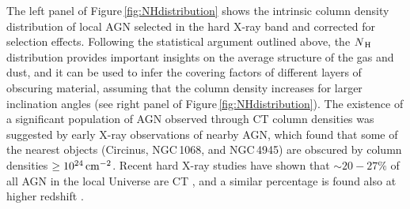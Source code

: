 \documentclass{natureprintstyle}
\begin{document}

The left panel of Figure\,\ref{fig:NHdistribution} shows the intrinsic column density distribution of local AGN selected in the hard X-ray band and corrected for selection effects. Following the statistical argument outlined above, the $N_{\rm\,H}$ distribution provides important insights on the average structure of the gas and dust, and it can be used to infer the covering factors of different layers of obscuring material, assuming that the column density increases for larger inclination angles (see right panel of Figure\,\ref{fig:NHdistribution}). 
%
%
The existence of a significant population of AGN observed through CT column densities was suggested by early X-ray observations of nearby AGN\cite{Risaliti:1999dw}, which found that some of the nearest objects (Circinus, NGC\,1068, and NGC\,4945) are obscured by column densities $\geq 10^{24}\rm\,cm^{-2}$. Recent hard X-ray studies have shown that $\sim 20-27\%$ of all AGN in the local Universe are CT \cite{Burlon:2011dk,Ricci:2015tg}, and a similar percentage is found also at higher redshift \cite{Ueda:2014ix,Brightman:2014zp,Buchner:2015ve,Lanzuisi:2015qr}.
\end{document}
